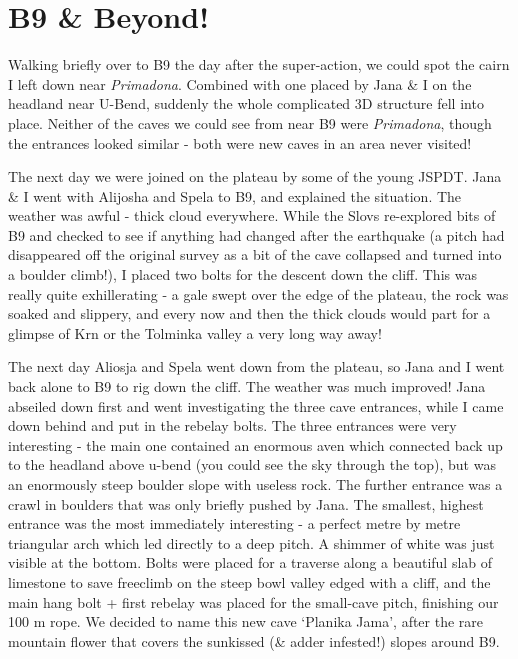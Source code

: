 
\hypertarget{b9-beyond}{%
\section{B9 \& Beyond!}\label{b9-beyond}}

Walking briefly over to B9 the day after the super-action, we could spot
the cairn I left down near \emph{Primadona}. Combined with one placed by
Jana \& I on the headland near U-Bend, suddenly the whole complicated 3D
structure fell into place. Neither of the caves we could see from near
B9 were \emph{Primadona}, though the entrances looked similar - both
were new caves in an area never visited!

The next day we were joined on the plateau by some of the young JSPDT.
Jana \& I went with Alijosha and Spela to B9, and explained the
situation. The weather was awful - thick cloud everywhere. While the
Slovs re-explored bits of B9 and checked to see if anything had changed
after the earthquake (a pitch had disappeared off the original survey as
a bit of the cave collapsed and turned into a boulder climb!), I placed
two bolts for the descent down the cliff. This was really quite
exhillerating - a gale swept over the edge of the plateau, the rock was
soaked and slippery, and every now and then the thick clouds would part
for a glimpse of Krn or the Tolminka valley a very long way away!

The next day Aliosja and Spela went down from the plateau, so Jana and I
went back alone to B9 to rig down the cliff. The weather was much
improved! Jana abseiled down first and went investigating the three cave
entrances, while I came down behind and put in the rebelay bolts. The
three entrances were very interesting - the main one contained an
enormous aven which connected back up to the headland above u-bend (you
could see the sky through the top), but was an enormously steep boulder
slope with useless rock. The further entrance was a crawl in boulders
that was only briefly pushed by Jana. The smallest, highest entrance was
the most immediately interesting - a perfect metre by metre triangular
arch which led directly to a deep pitch. A shimmer of white was just
visible at the bottom. Bolts were placed for a traverse along a
beautiful slab of limestone to save freeclimb on the steep bowl valley
edged with a cliff, and the main hang bolt + first rebelay was placed
for the small-cave pitch, finishing our 100 m rope. We decided to name
this new cave `Planika Jama', after the rare mountain flower that covers
the sunkissed (\& adder infested!) slopes around B9.

